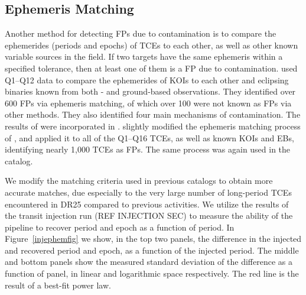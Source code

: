 
\subsection{Ephemeris Matching}
\label{ephemmatchsec}

Another method for detecting FPs due to contamination is to compare the ephemerides (periods and epochs) of TCEs to each other, as well as other known variable sources in the \kepler{} field. If two targets have the same ephemeris within a specified tolerance, then at least one of them is a FP due to contamination. \citet{Coughlin2014a} used Q1--Q12 data to compare the ephemerides of KOIs to each other and eclipsing binaries known from both \kepler{}- and ground-based observations. They identified over 600 FPs via ephemeris matching, of which over 100 were not known as FPs via other methods. They also identified four main mechanisms of contamination. The results of \citet{Coughlin2014a} were incorporated in \citet[][see \S3.3]{Rowe2015a}. \citet[][see \S5.3]{Mullally2015cat} slightly modified the ephemeris matching process of \citet{Coughlin2014a}, and applied it to all of the Q1--Q16 TCEs, as well as known KOIs and EBs, identifying nearly 1,000 TCEs as FPs. The same process was again used in the \citet{Coughlin2016} catalog.

We modify the matching criteria used in previous catalogs to obtain more accurate matches, due especially to the very large number of long-period TCEs encountered in DR25 compared to previous activities. We utilize the results of the transit injection run (REF INJECTION SEC) to measure the ability of the \kepler{} pipeline to recover period and epoch as a function of period. In Figure~\ref{injephemfig} we show, in the top two panels, the difference in the injected and recovered period and epoch, as a function of the injected period. The middle and bottom panels show the measured standard deviation of the difference as a function of panel, in linear and logarithmic space respectively. The red line is the result of a best-fit power law.

